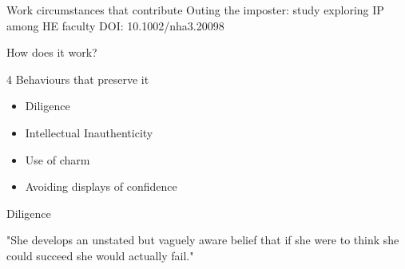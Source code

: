 \documentclass[aspectratio=169]{beamer}
\begin{document}
\begin{frame}
  \begin{center}
    \Huge Work circumstances that contribute
    Outing the imposter: study exploring IP among HE faculty
    DOI:  10.1002/nha3.20098
  \end{center}
\end{frame}

\begin{frame}
  \begin{center}
    \Huge How does it work?
  \end{center}
\end{frame}

\begin{frame}
  \begin{center}
    \Huge 4 Behaviours that preserve it
    \begin{itemize}
      \item Diligence
      \item Intellectual Inauthenticity
      \item Use of charm
      \item Avoiding displays of confidence
    \end{itemize}
  \end{center}
\end{frame}

\begin{frame}
  \begin{center}
    \Huge Diligence

    "She develops an unstated but vaguely aware belief that if she were to think she could succeed she would  actually  fail."
  \end{center}
\end{frame}
\end{document}
